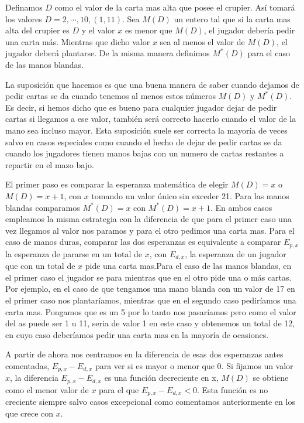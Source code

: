 \documentclass[12pt,a4paper,]{book}
\numberwithin{dummy}{section}
\theoremstyle{ocrenumbox}
\theoremstyle{blacknumex}
\theoremstyle{blacknumbox}
\theoremstyle{ocrenum}
\theoremstyle{ocrenum}
\begin{document}
Definamos \(D\) como el valor de la carta mas alta que posee el crupier.
Así tomará los valores \(D=2, \cdots, 10, (1,11)\). Sea \(M(D)\) un
entero tal que si la carta mas alta del crupier es \(D\) y el valor
\(x\) es menor que \(M(D)\), el jugador debería pedir una carta más.
Mientras que dicho valor \(x\) sea al menos el valor de \(M(D)\), el
jugador deberá plantarse. De la misma manera definimos \(M^*(D)\) para
el caso de las manos blandas.

La suposición que hacemos es que una buena manera de saber cuando
dejamos de pedir cartas se da cuando tenemos al menos estos números
\(M(D)\) y \(M^*(D)\). Es decir, si hemos dicho que es bueno para
cualquier jugador dejar de pedir cartas si llegamos a ese valor, también
será correcto hacerlo cuando el valor de la mano sea incluso mayor. Esta
suposición suele ser correcta la mayoría de veces salvo en casos
especiales como cuando el hecho de dejar de pedir cartas se da cuando
los jugadores tienen manos bajas con un numero de cartas restantes a
repartir en el mazo bajo.

El primer paso es comparar la esperanza matemática de elegir \(M(D)=x\)
o \(M(D)=x+1\), con \(x\) tomando un valor único sin exceder 21. Para
las manos blandas comparamos \(M^*(D)=x\) con \(M^*(D)=x+1\). En ambos
casos empleamos la misma estrategia con la diferencia de que para el
primer caso una vez llegamos al valor nos paramos y para el otro pedimos
una carta mas. Para el caso de manos duras, comparar las dos esperanzas
es equivalente a comparar \(E_{p,x}\) la esperanza de pararse en un
total de \(x\), con \(E_{d,x}\), la esperanza de un jugador que con un
total de \(x\) pide una carta mas.Para el caso de las manos blandas, en
el primer caso el jugador se para mientras que en el otro pide una o más
cartas. Por ejemplo, en el caso de que tengamos una mano blanda con un
valor de 17 en el primer caso nos plantaríamos, mientras que en el
segundo caso pediríamos una carta mas. Pongamos que es un 5 por lo tanto
nos pasaríamos pero como el valor del as puede ser 1 u 11, seria de
valor 1 en este caso y obtenemos un total de 12, en cuyo caso deberíamos
pedir una carta mas en la mayoría de ocasiones.

A partir de ahora nos centramos en la diferencia de esas dos esperanzas
antes comentadas, \(E_{p,x}-E_{d,x}\) para ver si es mayor o menor que
0. Si fijamos un valor \(x\), la diferencia \(E_{p,x}-E_{d,x}\) es una
función decreciente en x, \(M(D)\) se obtiene como el menor valor de
\(x\) para el que \(E_{p,x}-E_{d,x} < 0\). Esta función es no creciente
siempre salvo casos excepcional como comentamos anteriormente en los que
crece con \(x\).
\end{document}
